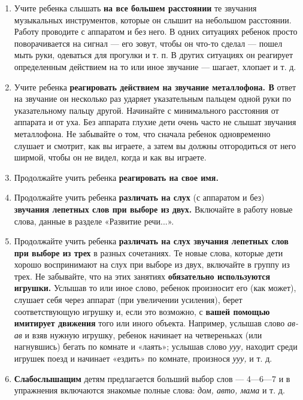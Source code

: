 \documentclass{book}
\renewcommand{\emph}[1]{\textit{#1}}
\begin{document}
\begin{enumerate}
\def\labelenumi{\arabic{enumi}.}
\item
  
  Учите ребенка слышать \textbf{на все большем расстоянии} те звучания
  музыкальных инструментов, которые он слышит на небольшом расстоянии.
  Работу проводите с аппаратом и без него. В одних ситуациях ребенок
  просто поворачивается на сигнал --- его зовут, чтобы он что-то сделал
  --- пошел мыть руки, одеваться для прогулки и т. п. В других ситуациях
  он реагирует определенным действием на то или иное звучание ---
  шагает, хлопает и т. д.
  
\item
  
  Учите ребенка \textbf{реагировать действием на звучание металлофона.
  В} ответ на звучание он несколько раз ударяет указательным пальцем
  одной руки по указательному пальцу другой. Начинайте с минимального
  расстояния от аппарата и от уха. Без аппарата глухие дети очень часто
  не слышат звучания металлофона. Не забывайте о том, что сначала
  ребенок одновременно слушает и смотрит, как вы играете, а затем вы
  должны отгородиться от него ширмой, чтобы он не видел, когда и как вы
  играете.
  
\item
  
  Продолжайте учить ребенка \textbf{реагировать на свое имя.}
  
\item
  
  Продолжайте учить ребенка \textbf{различать на слух} (с аппаратом и
  без) \textbf{звучания лепетных слов при выборе из двух.} Включайте в
  работу новые слова, данные в разделе «Развитие речи...».
  
\item
  
  Продолжайте учить ребенка \textbf{различать на слух звучания лепетных
  слов при выборе из трех} в разных сочетаниях. Те новые слова, которые
  дети хорошо воспринимают на слух при выборе из двух, включайте в
  группу из трех. Не забывайте, что на этих занятиях \textbf{обязательно
  используются игрушки.} Услышав то или иное слово, ребенок произносит
  его (как может), слушает себя через аппарат (при увеличении усиления),
  берет соответствующую игрушку и, если это возможно, с \textbf{вашей
  помощью имитирует движения} того или иного объекта. Например, услышав
  слово \emph{ав-ав} и взяв нужную игрушку, ребенок начинает на
  четвереньках (или нагнувшись) бегать по комнате и «лаять»; услышав
  слово \emph{ууу,} находит среди игрушек поезд и начинает «ездить» по
  комнате, произнося \emph{ууу,} и т. д.
  
\item
  
  \textbf{Слабослышащим} детям предлагается больший выбор слов ---
  4---6---7 и в упражнения включаются знакомые полные слова: \emph{дом,
  авто, мама} и т. д.
  
\end{enumerate}
\end{document}

